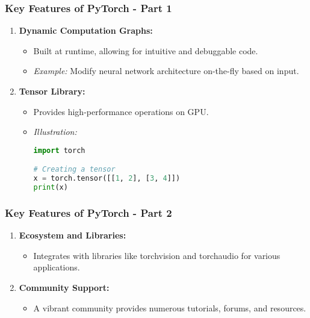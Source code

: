 \documentclass{beamer}
\begin{document}
\begin{frame}
    \frametitle{Key Features of PyTorch - Part 1}
    \begin{enumerate}
        \item \textbf{Dynamic Computation Graphs:}
        \begin{itemize}
            \item Built at runtime, allowing for intuitive and debuggable code.
            \item \textit{Example:} Modify neural network architecture on-the-fly based on input.
        \end{itemize}

        \item \textbf{Tensor Library:}
        \begin{itemize}
            \item Provides high-performance operations on GPU.
            \item \textit{Illustration:}
            \begin{lstlisting}[language=Python]
import torch

# Creating a tensor
x = torch.tensor([[1, 2], [3, 4]])
print(x)
            \end{lstlisting}
        \end{itemize}
    \end{enumerate}
\end{frame}

\begin{frame}
    \frametitle{Key Features of PyTorch - Part 2}
    \begin{enumerate}[start=3]
        \item \textbf{Ecosystem and Libraries:}
        \begin{itemize}
            \item Integrates with libraries like torchvision and torchaudio for various applications.
        \end{itemize}

        \item \textbf{Community Support:}
        \begin{itemize}
            \item A vibrant community provides numerous tutorials, forums, and resources.
        \end{itemize}
    \end{enumerate}
\end{frame}
\end{document}
